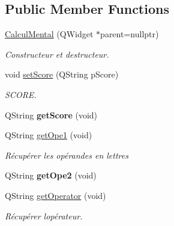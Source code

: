 \subsection*{Public Member Functions}
\begin{DoxyCompactItemize}
\item 
\mbox{\label{class_calcul_mental_a1d00ff120d4375847d790991edd85059}} 
\hyperlink{class_calcul_mental_a1d00ff120d4375847d790991edd85059}{Calcul\+Mental} (Q\+Widget $\ast$parent=nullptr)
\begin{DoxyCompactList}\small\item\em Constructeur et destructeur. \end{DoxyCompactList}\item 
\mbox{\label{class_calcul_mental_a2c3a044640c58c0cc865e286334ce591}} 
void \hyperlink{class_calcul_mental_a2c3a044640c58c0cc865e286334ce591}{set\+Score} (Q\+String p\+Score)
\begin{DoxyCompactList}\small\item\em S\+C\+O\+RE. \end{DoxyCompactList}\item 
\mbox{\label{class_calcul_mental_abfcfd41b1b8b818352674c2565dc084f}} 
Q\+String {\bfseries get\+Score} (void)
\item 
\mbox{\label{class_calcul_mental_a3d56b1b9c73714179370b3f0ca4420e9}} 
Q\+String \hyperlink{class_calcul_mental_a3d56b1b9c73714179370b3f0ca4420e9}{get\+Ope1} (void)
\begin{DoxyCompactList}\small\item\em Récupérer les opérandes en lettres \end{DoxyCompactList}\item 
\mbox{\label{class_calcul_mental_afa5c299ddbe9c23c0c12deb7765c70f1}} 
Q\+String {\bfseries get\+Ope2} (void)
\item 
\mbox{\label{class_calcul_mental_ab838d242ea4101002bf72f26b18c261b}} 
Q\+String \hyperlink{class_calcul_mental_ab838d242ea4101002bf72f26b18c261b}{get\+Operator} (void)
\begin{DoxyCompactList}\small\item\em Récupérer l\textquotesingle{}opérateur. \end{DoxyCompactList}\item 

\end{DoxyCompactItemize}
